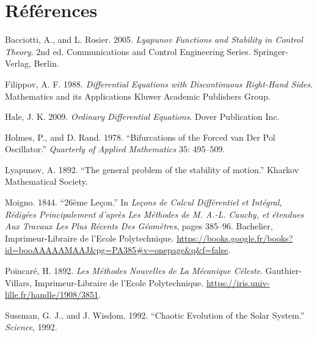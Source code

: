 \hypertarget{ruxe9fuxe9rences}{%
\chapter{Références}\label{ruxe9fuxe9rences}}

\hypertarget{refs}{}
\begin{cslreferences}
\leavevmode\hypertarget{ref-BacRos}{}%
Bacciotti, A., and L. Rosier. 2005. \emph{Lyapunov Functions and
Stability in Control Theory}. 2nd ed. Communications and Control
Engineering Series. Springer-Verlag, Berlin.

\leavevmode\hypertarget{ref-Fil}{}%
Filippov, A. F. 1988. \emph{Differential Equations with Discontinuous
Right-Hand Sides}. Mathematics and its Applications Kluwer Academic
Publishers Group.

\leavevmode\hypertarget{ref-Hale}{}%
Hale, J. K. 2009. \emph{Ordinary Differential Equations}. Dover
Publication Inc.

\leavevmode\hypertarget{ref-HolRand}{}%
Holmes, P., and D. Rand. 1978. ``Bifurcations of the Forced van Der Pol
Oscillator.'' \emph{Quarterly of Applied Mathematics} 35: 495--509.

\leavevmode\hypertarget{ref-lyap}{}%
Lyapunov, A. 1892. ``The general problem of the stability of motion.''
Kharkov Mathematical Society.

\leavevmode\hypertarget{ref-cauchy}{}%
Moigno. 1844. ``26ème Leçon.'' In \emph{Leçons de Calcul Différentiel et
Intégral, Rédigées Principalement d'après Les Méthodes de M. A.-L.
Cauchy, et étendues Aux Travaux Les Plus Récents Des Géomètres}, pages
385--96. Bachelier, Imprimeur-Libraire de l'Ecole Polytechnique.
\url{https://books.google.fr/books?id=booAAAAAMAAJ\&pg=PA385\#v=onepage\&q\&f=false}.

\leavevmode\hypertarget{ref-poincare}{}%
Poincaré, H. 1892. \emph{Les Méthodes Nouvelles de La Mécanique
Céleste}. Gauthier-Villars, Imprimeur-Libraire de l'Ecole Polytechnique.
\url{https://iris.univ-lille.fr/handle/1908/3851}.

\leavevmode\hypertarget{ref-SussWis}{}%
Sussman, G. J., and J. Wisdom. 1992. ``Chaotic Evolution of the Solar
System.'' \emph{Science}, 1992.
\end{cslreferences}
